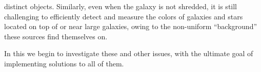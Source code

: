 \begin{itemize}
{  distinct objects.  Similarly, even when the galaxy is not shredded, it is
  still challenging to efficiently detect and measure the colors of galaxies and
  stars located on top of or near large galaxies, owing to the non-uniform
  ``background'' these sources find themselves on.}
\end{itemize}

\noindent In this \tnote{} we begin to investigate these and other issues, with
the ultimate goal of implementing solutions to all of them.

